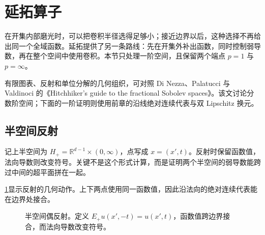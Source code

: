 \section{延拓算子}
\label{b1:sec:2203}

在开集内部磨光时，可以把卷积半径选得足够小；接近边界以后，这种选择不再给出同一个全域函数。延拓提供了另一条路线：先在开集外补出函数，同时控制弱导数，再在整个空间中使用卷积。本节只处理一阶空间，且保留两个端点 \(p=1\) 与 \(p=\infty\)。

\ProseParagraphBreak

有限图表、反射和单位分解的几何组织，可对照 Di Nezza、Palatucci 与 Valdinoci 的《Hitchhiker's guide to the fractional Sobolev spaces》\cite[Section 5]{DiNezza2012Hitchhikers}。该文讨论分数阶空间；下面的一阶证明则使用前章的沿线绝对连续代表与双 Lipschitz 换元。

\subsection{半空间反射}
\label{b1:subsec:220301}

记上半空间为 \(H_+=\mathbb R^{d-1}\times(0,\infty)\)，点写成 \(x=(x',t)\)。反射时保留函数值，法向导数则改变符号。关键不是这个形式计算，而是证明两个半空间的弱导数能跨过中间的超平面拼在一起。

\ProseParagraphBreak

\cref{b1:fig:half-space-even-reflection}显示反射的几何动作。上下两点使用同一函数值，因此沿法向的绝对连续代表能在边界处接合。
\begin{figure}[htbp]
  \centering
  \caption[半空间偶反射]{半空间偶反射。定义 \(E_+u(x',-t)=u(x',t)\)，函数值跨边界接合，而法向导数改变符号。}
  \label{b1:fig:half-space-even-reflection}
\end{figure}

